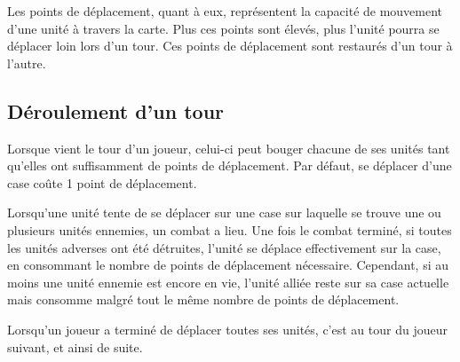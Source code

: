 	Les points de déplacement, quant à eux, représentent la capacité de mouvement d'une unité à travers la carte. Plus ces points sont élevés, plus l'unité pourra se déplacer loin lors d'un tour. Ces points de déplacement sont restaurés d'un tour à l'autre.
	
	\subsection{Déroulement d'un tour}
	Lorsque vient le tour d'un joueur, celui-ci peut bouger chacune de ses unités tant qu'elles ont suffisamment de points de déplacement. Par défaut, se déplacer d'une case coûte 1 point de déplacement.
	
	Lorsqu'une unité tente de se déplacer sur une case sur laquelle se trouve une ou plusieurs unités ennemies, un combat a lieu. Une fois le combat terminé, si toutes les unités adverses ont été détruites, l'unité se déplace effectivement sur la case, en consommant le nombre de points de déplacement nécessaire. Cependant, si au moins une unité ennemie est encore en vie, l'unité alliée reste sur sa case actuelle mais consomme malgré tout le même nombre de points de déplacement.
	
	Lorsqu'un joueur a terminé de déplacer toutes ses unités, c'est au tour du joueur suivant, et ainsi de suite.